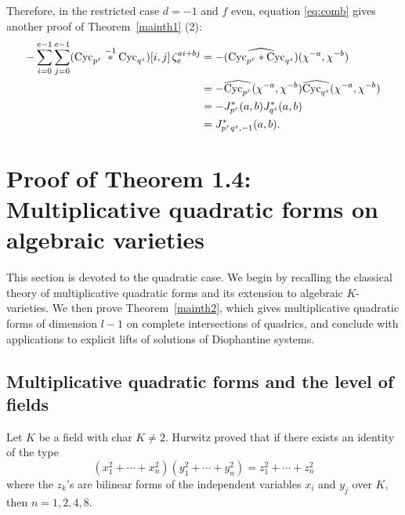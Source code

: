 \documentclass[a4paper, 11pt]{amsart}
\theoremstyle{plain}
\theoremstyle{definition}
\numberwithin{equation}{section}
\begin{document}
Therefore, in the restricted case $d=-1$ and $f$ even, equation \eqref{eq:comb} gives another proof of Theorem~\ref{mainth1} (2):
\begin{align*}
-\sum_{i=0}^{e-1}\sum_{j=0}^{e-1}({\rm Cyc}_{p^r}\overset{-1}{\ast}{\rm Cyc}_{q^s})[i,j]\,\zeta_e^{ai+bj}
&=-\widehat{({\rm Cyc}_{p^r}\ast {\rm Cyc}_{q^s})}(\chi^{-a},\chi^{-b})\\
&=-\widehat{{\rm Cyc}_{p^r}}(\chi^{-a},\chi^{-b})\widehat{{\rm Cyc}_{q^s}}(\chi^{-a},\chi^{-b})\\
&=-J_{p^r}^{\ast}(a,b)J_{q^s}^{\ast}(a,b)\\
&=J^{*}_{p^rq^s,-1}(a,b). 
\end{align*}

\section{Proof of Theorem 1.4: Multiplicative quadratic forms on algebraic varieties}\label{S4}

This section is devoted to the quadratic case. 
We begin by recalling the classical theory of multiplicative quadratic forms and its extension to algebraic $K$-varieties. 
We then prove Theorem~\ref{mainth2}, which gives multiplicative quadratic forms of dimension $l-1$ on complete intersections of quadrics, and conclude with applications to explicit lifts of solutions of Diophantine systems.

\subsection{Multiplicative quadratic forms and the level of fields}\label{S4-1}

Let $K$ be a field with char $K\neq 2$. 
Hurwitz \cite{Hur1898} proved that if there exists an identity of the type 
\[
(x_1^2+\cdots+x_n^2)(y_1^2+\cdots+y_n^2)=z_1^2+\cdots+z_n^2
\]
where the $z_k$'s are bilinear forms of the independent variables 
$x_i$ and $y_j$ over $K$, then $n=1,2,4,8$.
\end{document}
